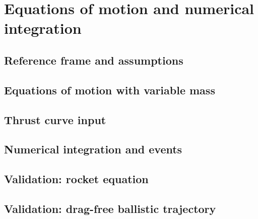\section{Equations of motion and numerical integration}\label{sec:dynamics}

\subsection{Reference frame and assumptions}
\subsection{Equations of motion with variable mass}
\subsection{Thrust curve input}
\subsection{Numerical integration and events}
\subsection{Validation: rocket equation}
\subsection{Validation: drag-free ballistic trajectory}

